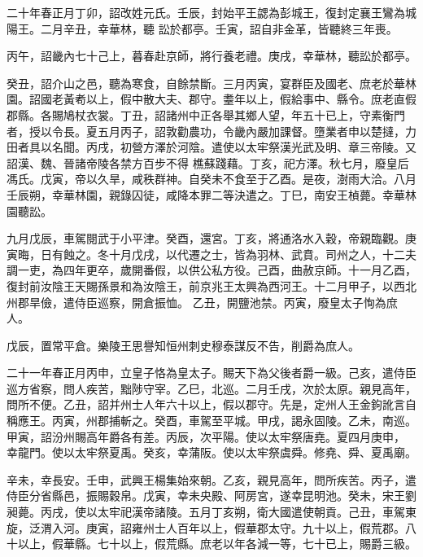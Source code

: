 \begin{pinyinscope}
 二十年春正月丁卯，詔改姓元氏。壬辰，封始平王勰為彭城王，復封定襄王鸞為城陽王。二月辛丑，幸華林，聽
 訟於都亭。壬寅，詔自非金革，皆聽終三年喪。



 丙午，詔畿內七十己上，暮春赴京師，將行養老禮。庚戌，幸華林，聽訟於都亭。



 癸丑，詔介山之邑，聽為寒食，自餘禁斷。三月丙寅，宴群臣及國老、庶老於華林園。詔國老黃耇以上，假中散大夫、郡守。耋年以上，假給事中、縣令。庶老直假郡縣。各賜鳩杖衣裳。丁丑，詔諸州中正各舉其鄉人望，年五十已上，守素衡門者，授以令長。夏五月丙子，詔敦勸農功，令畿內嚴加課督。墮業者申以楚撻，力田者具以名聞。丙戌，初營方澤於河陰。遣使以太牢祭漢光武及明、章三帝陵。又詔漢、魏、晉諸帝陵各禁方百步不得
 樵蘇踐藉。丁亥，祀方澤。秋七月，廢皇后馮氏。戊寅，帝以久旱，咸秩群神。自癸未不食至于乙酉。是夜，澍雨大洽。八月壬辰朔，幸華林園，親錄囚徒，咸降本罪二等決遣之。丁巳，南安王楨薨。幸華林園聽訟。



 九月戊辰，車駕閱武于小平津。癸酉，還宮。丁亥，將通洛水入穀，帝親臨觀。庚寅晦，日有蝕之。冬十月戊戌，以代遷之士，皆為羽林、武賁。司州之人，十二夫調一吏，為四年更卒，歲開番假，以供公私方役。己酉，曲赦京師。十一月乙酉，復封前汝陰王天賜孫景和為汝陰王，前京兆王太興為西河王。十二月甲子，以西北州郡旱儉，遣侍臣巡察，開倉振恤。
 乙丑，開鹽池禁。丙寅，廢皇太子恂為庶人。



 戊辰，置常平倉。樂陵王思譽知恒州刺史穆泰謀反不告，削爵為庶人。



 二十一年春正月丙申，立皇子恪為皇太子。賜天下為父後者爵一級。己亥，遣侍臣巡方省察，問人疾苦，黜陟守宰。乙巳，北巡。二月壬戌，次於太原。親見高年，問所不便。乙丑，詔并州士人年六十以上，假以郡守。先是，定州人王金鉤訛言自稱應王。丙寅，州郡捕斬之。癸酉，車駕至平城。甲戌，謁永固陵。乙未，南巡。甲寅，詔汾州賜高年爵各有差。丙辰，次平陽。使以太牢祭唐堯。夏四月庚申，
 幸龍門。使以太牢祭夏禹。癸亥，幸蒲阪。使以太牢祭虞舜。修堯、舜、夏禹廟。



 辛未，幸長安。壬申，武興王楊集始來朝。乙亥，親見高年，問所疾苦。丙子，遣侍臣分省縣邑，振賜穀帛。戊寅，幸未央殿、阿房宮，遂幸昆明池。癸未，宋王劉昶薨。丙戌，使以太牢祀漢帝諸陵。五月丁亥朔，衛大國遣使朝貢。己丑，車駕東旋，泛渭入河。庚寅，詔雍州士人百年以上，假華郡太守。九十以上，假荒郡。八十以上，假華縣。七十以上，假荒縣。庶老以年各減一等，七十已上，賜爵三級。




\end{pinyinscope}
